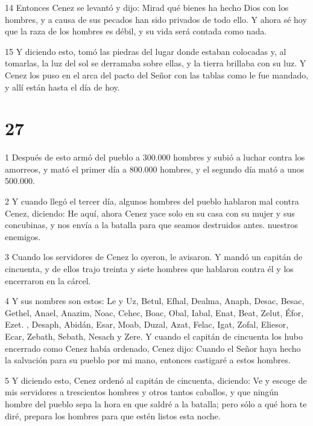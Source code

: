 \par 14 Entonces Cenez se levantó y dijo: Mirad qué bienes ha hecho Dios con los hombres, y a causa de sus pecados han sido privados de todo ello. Y ahora sé hoy que la raza de los hombres es débil, y su vida será contada como nada.

\par 15 Y diciendo esto, tomó las piedras del lugar donde estaban colocadas y, al tomarlas, la luz del sol se derramaba sobre ellas, y la tierra brillaba con su luz. Y Cenez los puso en el arca del pacto del Señor con las tablas como le fue mandado, y allí están hasta el día de hoy.

\chapter{27}

\par 1 Después de esto armó del pueblo a 300.000 hombres y subió a luchar contra los amorreos, y mató el primer día a 800.000 hombres, y el segundo día mató a unos 500.000.

\par 2 Y cuando llegó el tercer día, algunos hombres del pueblo hablaron mal contra Cenez, diciendo: He aquí, ahora Cenez yace solo en su casa con su mujer y sus concubinas, y nos envía a la batalla para que seamos destruidos antes. nuestros enemigos.

\par 3 Cuando los servidores de Cenez lo oyeron, le avisaron. Y mandó un capitán de cincuenta, y de ellos trajo treinta y siete hombres que hablaron contra él y los encerraron en la cárcel.

\par 4 Y sus nombres son estos: Le y Uz, Betul, Efhal, Dealma, Anaph, Desac, Besac, Gethel, Anael, Anazim, Noac, Cehec, Boac, Obal, Iabal, Enat, Beat, Zelut, Éfor, Ezet. , Desaph, Abidán, Esar, Moab, Duzal, Azat, Felac, Igat, Zofal, Eliesor, Ecar, Zebath, Sebath, Nesach y Zere. Y cuando el capitán de cincuenta los hubo encerrado como Cenez había ordenado, Cenez dijo: Cuando el Señor haya hecho la salvación para su pueblo por mi mano, entonces castigaré a estos hombres.

\par 5 Y diciendo esto, Cenez ordenó al capitán de cincuenta, diciendo: Ve y escoge de mis servidores a trescientos hombres y otros tantos caballos, y que ningún hombre del pueblo sepa la hora en que saldré a la batalla; pero sólo a qué hora te diré, prepara los hombres para que estén listos esta noche.

